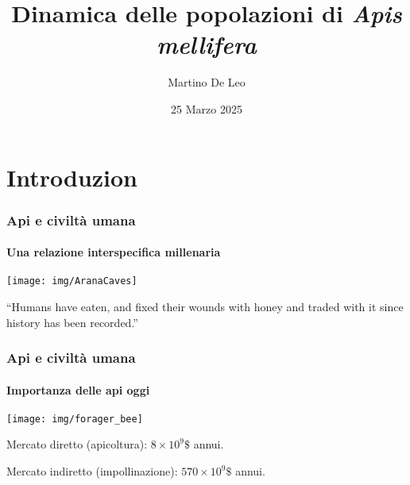\documentclass[]{beamer}
\title{Dinamica delle popolazioni di \emph{Apis mellifera}}
\author[]{Martino De Leo}
\date{25 Marzo 2025}
\begin{document}

\section{Introduzion}


\begin{frame}
    \maketitle
\end{frame}


\begin{frame}
    \frametitle{Api e civiltà umana}
    \framesubtitle{Una relazione interspecifica millenaria}

    \begin{center}
        \texttt{[image: img/AranaCaves]}
    \end{center}

    \begin{displayquote}
        ``Humans have eaten, and fixed their wounds with honey and traded with it since history has been recorded.''
    \end{displayquote}
\end{frame}


\begin{frame}
    \frametitle{Api e civiltà umana}
    \framesubtitle{Importanza delle api oggi}

    \begin{center}
        \texttt{[image: img/forager\_bee]}
    \end{center}

    Mercato diretto (apicoltura): $8 \times 10^9 \$$ annui.

    \pause
    Mercato indiretto (impollinazione): $570 \times 10^9 \$$ annui.
\end{frame}
\end{document}
